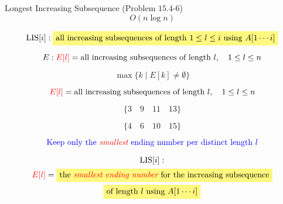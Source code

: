\begin{frame}{}
  \begin{exampleblock}{Longest Increasing Subsequence (Problem $15.4$-$6$)}
    \[
      O(n \log n)
    \]
  \end{exampleblock}

  \[
    \text{LIS}[i]: \hl{yellow}{\text{all increasing subsequences of length $1 \le l \le i$ using $A[1 \cdots i]$}}
  \]

  \pause
  \[
    E: \textcolor{red}{E[l]} = \text{all increasing subsequences of length $l$}, \quad 1 \le l \le n
  \]

  \pause
  \[
    \max \{k \mid E[k] \neq \emptyset \}
  \]
\end{frame}

\begin{frame}{}
  \[
    \textcolor{red}{E[l]} = \text{all increasing subsequences of length $l$}, \quad 1 \le l \le n
  \]

  \pause
  \[
    \{3\quad 9\quad 11\quad 13\}
  \]

  \[
    \{4\quad 6\quad 10\quad 15\}
  \]

  \pause
  \[
    \text{\textcolor{blue}{Keep only the \textcolor{red}{\it smallest} ending number per distinct length $l$}}
  \]

  \begin{gather*}
    \text{LIS}[i]: \\
    \red{E[l]} = \hl{yellow}{\text{the \red{\it smallest ending number} for the increasing subsequence}} \\
      \hl{yellow}{\text{of length $l$ using $A[1 \cdots i]$}}
  \end{gather*}
\end{frame}

\begin{frame}{}

\end{frame}

\begin{frame}{}
\end{frame}
